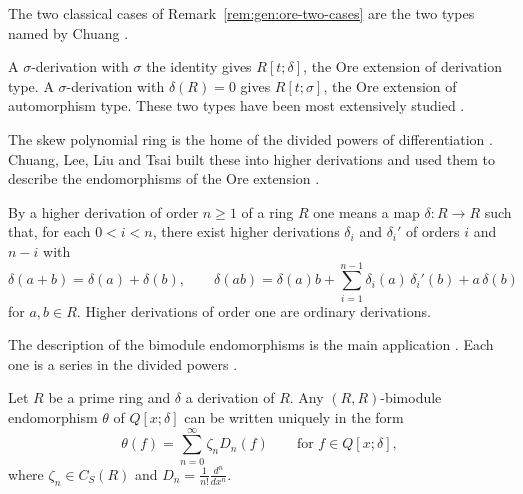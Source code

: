 The two classical cases of Remark~\ref{rem:gen:ore-two-cases} are the two
types named by Chuang \cite[p.~2838]{Chuang2017Auto}.

\begin{remark}\label{rem:gen:ore-two-types}
A $\sigma$-derivation with $\sigma$ the identity gives $R[t;\delta]$, the Ore
extension of derivation type. A $\sigma$-derivation with $\delta(R)=0$ gives
$R[t;\sigma]$, the Ore extension of automorphism type. These two types have
been most extensively studied \cite[p.~2838]{Chuang2017Auto}.
\end{remark}

The skew polynomial ring is the home of the divided powers of
differentiation \cite[p.~158]{ChuangLee2010Higher}. Chuang, Lee, Liu and Tsai
built these into higher derivations
and used them to describe the endomorphisms of the Ore extension
\cite[p.~158]{ChuangLee2010Higher}.

\begin{definition}\label{def:gen:higher-derivation}
By a higher derivation of order $n\ge1$ of a ring $R$ one means a map
$\delta\colon R\to R$ such that, for each $0<i<n$, there exist higher
derivations $\delta_i$ and $\delta_i'$ of orders $i$ and $n-i$ with
\begin{equation*}
\delta(a+b)=\delta(a)+\delta(b),\qquad
\delta(ab)=\delta(a)b+\sum_{i=1}^{n-1}\delta_i(a)\,\delta_i'(b)+a\,\delta(b)
\end{equation*}
for $a,b\in R$. Higher derivations of order one are ordinary derivations.
\end{definition}

The description of the bimodule endomorphisms is the main application
\cite[p.~174]{ChuangLee2010Higher}. Each one is a series in the divided powers
\cite[Theorem~12, p.~174]{ChuangLee2010Higher}.

\begin{theorem}\label{thm:gen:ore-endomorphism}
Let $R$ be a prime ring and $\delta$ a derivation of $R$. Any
$(R,R)$-bimodule endomorphism $\theta$ of $Q[x;\delta]$ can be written
uniquely in the form
\begin{equation*}
\theta(f)=\sum_{n=0}^{\infty}\zeta_n D_n(f)\qquad\text{for } f\in Q[x;\delta],
\end{equation*}
where $\zeta_n\in C_S(R)$ and $D_n=\frac{1}{n!}\frac{d^n}{dx^n}$.
\end{theorem}

